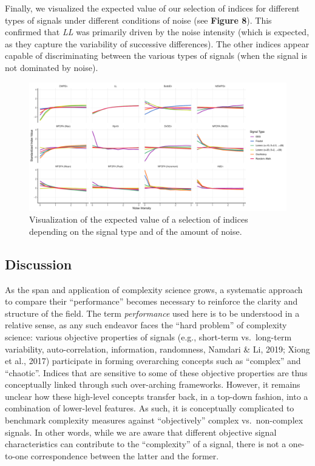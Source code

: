 \documentclass[
  man]{apa6}
\begin{document}
Finally, we visualized the expected value of our selection of indices for different types of signals under different conditions of noise (see \textbf{Figure 8}). This confirmed that \emph{LL} was primarily driven by the noise intensity (which is expected, as they capture the variability of successive differences). The other indices appear capable of discriminating between the various types of signals (when the signal is not dominated by noise).

\begin{figure}
\centering
\includegraphics{./figures/models-1.pdf}
\caption{\label{fig:models}Visualization of the expected value of a selection of indices depending on the signal type and of the amount of noise.}
\end{figure}

\hypertarget{discussion}{%
\subsection{Discussion}\label{discussion}}

As the span and application of complexity science grows, a systematic approach to compare their ``performance'' becomes necessary to reinforce the clarity and structure of the field. The term \emph{performance} used here is to be understood in a relative sense, as any such endeavor faces the ``hard problem'' of complexity science: various objective properties of signals (e.g., short-term vs.~long-term variability, auto-correlation, information, randomness, Namdari \& Li, 2019; Xiong et al., 2017) participate in forming overarching concepts such as ``complex'' and ``chaotic''. Indices that are sensitive to some of these objective properties are thus conceptually linked through such over-arching frameworks. However, it remains unclear how these high-level concepts transfer back, in a top-down fashion, into a combination of lower-level features. As such, it is conceptually complicated to benchmark complexity measures against ``objectively'' complex vs.~non-complex signals. In other words, while we are aware that different objective signal characteristics can contribute to the ``complexity'' of a signal, there is not a one-to-one correspondence between the latter and the former.
\end{document}
